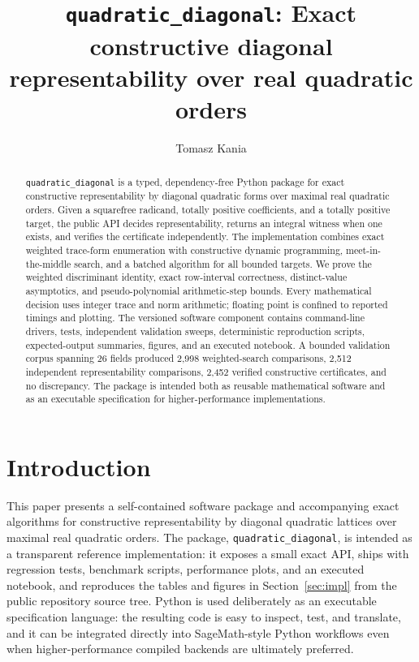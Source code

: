 \documentclass[manuscript]{acmart}
\title[\texttt{quadratic\_diagonal}: exact diagonal representability]{\texttt{quadratic\_diagonal}: Exact constructive diagonal representability over real quadratic orders}
\author{Tomasz Kania}
\affiliation{%
  \institution{Institute of Mathematics, Czech Academy of Sciences, \v{Z}itn\'a 25, 115 67 Prague 1}
  \city{Prague 1}
  \country{Czech Republic}}
\affiliation{%
  \institution{Institute of Mathematics, Jagiellonian University, \L ojasiewicza 6, 30-348 Krak\'ow}
  \city{Krak\'ow}
  \country{Poland}}
\theoremstyle{plain}
\theoremstyle{definition}
\theoremstyle{nonitalicremark}
\begin{document}
\begin{abstract}
\texttt{quadratic\_diagonal} is a typed, dependency-free Python package for exact constructive
representability by diagonal quadratic forms over maximal real quadratic orders. Given a squarefree
radicand, totally positive coefficients, and a totally positive target, the public API decides
representability, returns an integral witness when one exists, and verifies the certificate
independently. The implementation combines exact weighted trace-form enumeration with constructive
dynamic programming, meet-in-the-middle search, and a batched algorithm for all bounded targets. We
prove the weighted discriminant identity, exact row-interval correctness, distinct-value
asymptotics, and pseudo-polynomial arithmetic-step bounds. Every mathematical decision uses integer
trace and norm arithmetic; floating point is confined to reported timings and plotting. The versioned
software component contains command-line drivers, tests, independent validation sweeps, deterministic
reproduction scripts, expected-output summaries, figures, and an executed notebook. A bounded
validation corpus spanning 26 fields produced 2,998 weighted-search comparisons, 2,512 independent
representability comparisons, 2,452 verified constructive certificates, and no discrepancy. The
package is intended both as reusable mathematical software and as an executable specification for
higher-performance implementations.
\end{abstract}




\maketitle

\section{Introduction}

This paper presents a self-contained software package and accompanying exact algorithms for
constructive representability by diagonal quadratic lattices over maximal real quadratic orders. The
package, \texttt{quadratic\_diagonal}, is intended as a transparent reference implementation: it
exposes a small exact API, ships with regression tests, benchmark scripts, performance plots, and an
executed notebook, and reproduces the tables and figures in Section~\ref{sec:impl} from the public
repository source tree. Python is used deliberately as an executable specification language: the
resulting code is easy to inspect, test, and translate, and it can be integrated directly into
SageMath-style Python workflows even when higher-performance compiled backends are ultimately
preferred.
\end{document}
